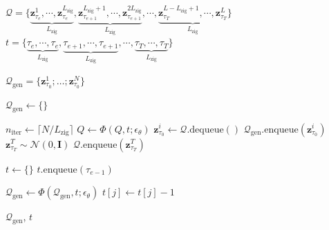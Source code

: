 \documentclass{article}
\theoremstyle{plain}
\theoremstyle{definition}
\theoremstyle{remark}
\begin{document}
\begin{algorithm}[htbp]
\caption{Two-stage training-inference alignment mechanism in MIGA}
\label{alg:miga_tta}
\begin{algorithmic}[1]

 $\mathcal{Q} = \{
\underbrace{\mathbf{z}^1_{\tau _e}, \cdots, \mathbf{z}^{L_{\mathrm{zig}}}_{\tau_e}}_{L_{\mathrm{zig}}},
\underbrace{\mathbf{z}^{L_{\mathrm{zig}}+1}_{\tau_{e+1}}, \cdots, \mathbf{z}^{2L_{\mathrm{zig}}}_{\tau_{e+1}}}_{L_{\mathrm{zig}}},
\cdots,
\underbrace{\mathbf{z}^{L-L_{\mathrm{zig}}+1}_{\tau_T}, \cdots, \mathbf{z}^{L}_{\tau_T}}_{L_{\mathrm{zig}}}\}$
\STATE \quad $t = \{
\underbrace{\tau_e, \cdots, \tau_e}_{L_{\mathrm{zig}}},
\underbrace{\tau_{e+1}, \cdots, \tau_{e+1}}_{L_{\mathrm{zig}}},
\cdots,
\underbrace{\tau_T, \cdots, \tau_T}_{L_{\mathrm{zig}}}\}$

 $\mathcal{Q}_\mathrm{gen} = \{\mathbf{z}_{\tau_0}^1; \dots; \mathbf{z}_{\tau_0}^N\}$

\STATE $\mathcal{Q}_\mathrm{gen} \gets \{\}$
\STATE {\bfseries \textcolor{blue}{\# Stage 1: Zigzag iterative denoising.}}

\STATE $n_{\mathrm{iter}} \gets \lceil N / L_{\mathrm{zig}} \rceil$
    \STATE $Q \gets \Phi(Q, t; \epsilon_{\theta})$
        \STATE $\mathbf{z}_{\tau_0}^i \gets \mathcal{Q}.\text{dequeue}()$
        \STATE $\mathcal{Q}_\mathrm{gen}.\text{enqueue}(\mathbf{z}_{\tau_0}^i)$
        \STATE $\mathbf{z}_{\tau_T}^T \sim \mathcal{N}(0, \mathbf{I})$
        \STATE $\mathcal{Q}.\text{enqueue}(\mathbf{z}_{\tau_T}^T)$
    \ENDFOR
\ENDFOR

\STATE {\bfseries \textcolor{blue}{\# Stage 2: Denoising at a unified noise level.}}
\STATE $t \gets \{\}$
    \STATE $t.\text{enqueue}(\tau_{e-1})$
\ENDFOR

    \STATE $\mathcal{Q}_\mathrm{gen} \gets \Phi(\mathcal{Q}_\mathrm{gen}, t; \epsilon_{\theta})$
        \STATE $t[j] \gets t[j] - 1$
    \ENDFOR
\ENDFOR

 $\mathcal{Q}_\mathrm{gen}$, \quad $t$

\end{algorithmic}
\end{algorithm}
\end{document}
